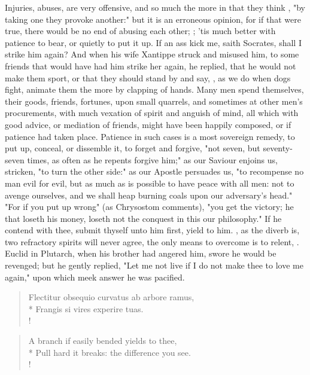 {Injuries, abuses, are very offensive, and so much the more in that they think , "by taking one they provoke another:" but it is an erroneous opinion, for if that were true, there would be no end of abusing each other; ; 'tis much better with patience to bear, or quietly to put it up. If an ass kick me, saith Socrates, shall I strike him again? And when his wife Xantippe struck and misused him, to some friends that would have had him strike her again, he replied, that he would not make them sport, or that they should stand by and say, , as we do when dogs fight, animate them the more by clapping of hands. Many men spend themselves, their goods, friends, fortunes, upon small quarrels, and sometimes at other men's procurements, with much vexation of spirit and anguish of mind, all which with good advice, or mediation of friends, might have been happily composed, or if patience had taken place. Patience in such cases is a most sovereign remedy, to put up, conceal, or dissemble it, to forget and forgive, "not seven, but seventy-seven times, as often as he repents forgive him;"  as our Saviour enjoins us, stricken, "to turn the other side:" as our Apostle persuades us, "to recompense no man evil for evil, but as much as is possible to have peace with all men: not to avenge ourselves, and we shall heap burning coals upon our adversary's head." "For if you put up wrong" (as Chrysostom comments), "you get the victory; he that loseth his money, loseth not the conquest in this our philosophy." If he contend with thee, submit thyself unto him first, yield to him. , as the diverb is, two refractory spirits will never agree, the only means to overcome is to relent, . Euclid in Plutarch, when his brother had angered him, swore he would be revenged; but he gently replied, "Let me not live if I do not make thee to love me again," upon which meek answer he was pacified.

\begin{latin}%
\begin{verse}%
Flectitur obsequio curvatus ab arbore ramus,\\*
Frangis si vires experire tuas.\\!
\end{verse}%
\end{latin}%
\translationrule%
\begin{verse}%
A branch if easily bended yields to thee,\\*
Pull hard it breaks: the difference you see.\\!
\end{verse}%

}
